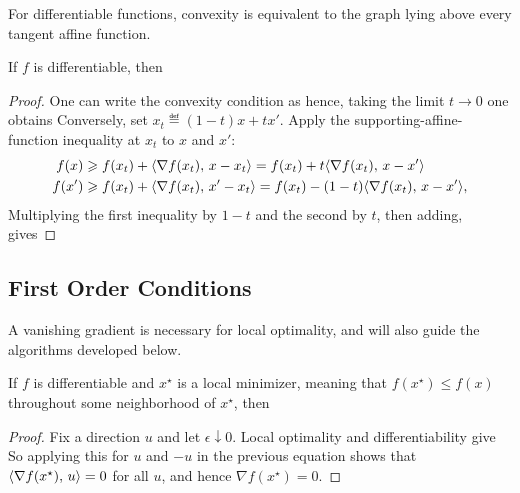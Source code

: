 For differentiable functions, convexity is equivalent to the graph lying above every tangent affine function.

\begin{prop}\label{prop-above-tgt}
	If $f$ is differentiable, then
\end{prop}
\begin{proof}
	One can write the convexity condition as
	hence, taking the limit $t \rightarrow 0$ one obtains
	Conversely, set $x_t\eqdef(1-t)x+tx'$. Apply the supporting-affine-function inequality at $x_t$ to $x$ and $x'$:
	\begin{align*}
		f(x)  & \geqslant f(x_t) + \langle \nabla f(x_t),\,x-x_t\rangle =f(x_t)+t\langle \nabla f(x_t),\,x-x'\rangle \\
		f(x') & \geqslant f(x_t) + \langle \nabla f(x_t),\,x'-x_t\rangle =f(x_t)-(1-t)\langle \nabla f(x_t),\,x-x'\rangle,
	\end{align*}
	Multiplying the first inequality by $1-t$ and the second by $t$, then adding, gives
\end{proof}


\subsection{First Order Conditions}

A vanishing gradient is necessary for local optimality, and will also guide the algorithms developed below.

\begin{prop}\label{prop-cs-min} 
If $f$ is differentiable and $x^\star$ is a local minimizer, meaning that $f(x^\star)\leq f(x)$ throughout some neighborhood of $x^\star$, then
\end{prop}
\begin{proof}
Fix a direction $u$ and let $\epsilon\downarrow0$. Local optimality and differentiability give
So applying this for $u$ and $-u$ in the previous equation shows that $\langle \nabla f(x^\star),\,u\rangle=0$ for all $u$, and hence $\nabla f(x^\star)=0$.
\end{proof}

